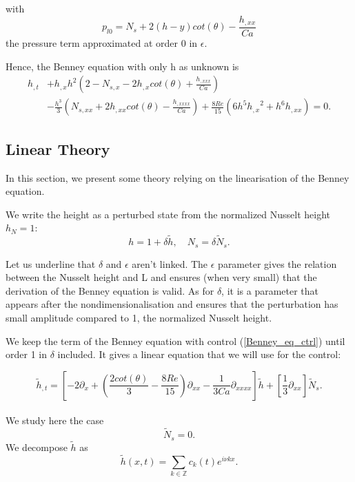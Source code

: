 \documentclass[12pt]{article}
\begin{document}
with 
\begin{equation}
p_{l0}= N_s + 2(h-y)cot(\theta) - \frac{h_{,xx}}{Ca}
\end{equation}
the pressure term approximated at order 0 in $\epsilon$.

Hence, the Benney equation with only h as unknown is 
\begin{equation}\label{Benney_eq_ctrl}
\boxed{
\begin{aligned}
    h_{,t} &+ h_{,x}h^2 \left( 2-N_{s, x}-2h_{,x}cot(\theta) + \frac{h_{,xxx}}{Ca}\right) \\ &- \frac{h^3}{3}\left(N_{s, xx} + 2h_{,xx}cot(\theta)  - \frac{h_{,xxxx}}{Ca} \right)
    + \frac{8Re}{15} \left( 6h^5 {h_{,x}}^2 + h^6 h_{,xx} \right) = 0.
\end{aligned}
}
\end{equation}

\subsection{Linear Theory}\label{subsubsection_linear_theory}
In this section, we present some theory relying on the linearisation of the Benney equation. 

We write the height as a perturbed state from the normalized Nusselt height $h_N =1:$
\begin{equation}\label{h_linear_decomposition}
    \boxed{
    h = 1+\delta \tilde{h},\quad N_s = \delta \tilde{N}_s.
    }
\end{equation}

Let us underline that $\delta$ and $\epsilon$ aren't linked. The $\epsilon$ parameter gives the relation between 
the Nusselt height and L and ensures (when very small) that the derivation of the Benney equation is valid. As for $\delta$, 
it is a parameter that appears after the nondimensionalisation and ensures that the perturbation has small amplitude compared 
to 1, the normalized Nusselt height. 

We  keep the term of the Benney equation with control (\ref{Benney_eq_ctrl}) until order 1 in $\delta$ included. It gives a linear equation that we will use for the control:

\begin{equation}\label{Benney_ctrl_linearised}
    \boxed{
    \tilde{h}_{,t} = \left[ -2\partial_x + (\frac{2cot(\theta)}{3}-\frac{8Re}{15})\partial_{xx} - \frac{1}{3Ca}\partial_{xxxx}\right]\tilde{h} + \left[ \frac{1}{3}\partial_{xx}\right]\tilde{N}_s
    .}
\end{equation}
\\
We study here the case $$\tilde{N}_s = 0.$$
We decompose $\tilde{h}$ as $$\tilde{h}(x,t) = \sum_{k\in\mathbb{Z}}c_k(t)e^{i\nu kx}.$$
\end{document}
